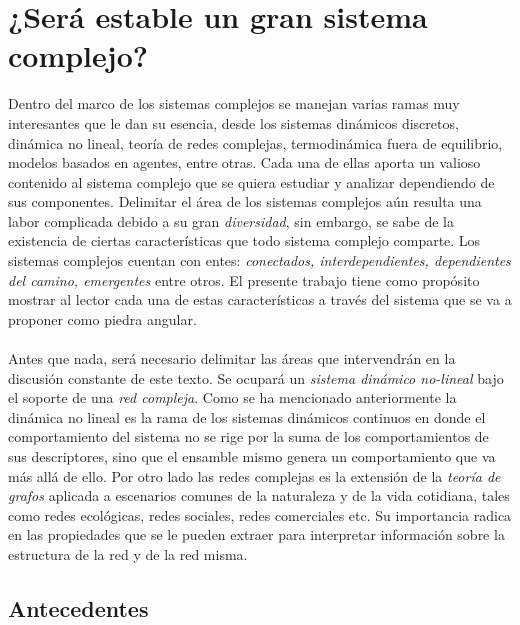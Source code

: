 \chapter{¿Será estable un gran sistema complejo?}

Dentro del marco de los sistemas complejos se manejan varias ramas muy interesantes que le dan su esencia, desde los sistemas dinámicos discretos, dinámica no lineal, teoría de redes complejas, termodinámica fuera de equilibrio, modelos basados en agentes, entre otras. Cada una de ellas aporta un valioso contenido al sistema complejo que se quiera estudiar y analizar dependiendo de sus componentes. Delimitar el área de los sistemas complejos aún resulta una labor complicada debido a su gran \textit{diversidad}, sin embargo, se sabe de la existencia de ciertas características que todo sistema complejo comparte. Los sistemas complejos cuentan con entes: \textit{conectados, interdependientes, dependientes del camino, emergentes} entre otros. El presente trabajo tiene como propósito mostrar al lector cada una de estas características a través del sistema que se va a proponer como piedra angular.\\
\\
Antes que nada, será necesario delimitar las áreas que intervendrán en la discusión constante de este texto. Se ocupará un \textit{sistema dinámico no-lineal} bajo el soporte de una \textit{red compleja}. Como se ha mencionado anteriormente la dinámica no lineal es la rama de los sistemas dinámicos continuos en donde el comportamiento del sistema no se rige por la suma de los comportamientos de sus descriptores, sino que el ensamble mismo genera un comportamiento que va más allá de ello. Por otro lado las redes complejas es la extensión de la \textit{teoría de grafos} aplicada a escenarios comunes de la naturaleza y de la vida cotidiana, tales como redes ecológicas, redes sociales, redes comerciales etc. Su importancia radica en las propiedades que se le pueden extraer para interpretar información sobre la estructura de la red y de la red misma.

\section{Antecedentes}\label{sec:Antecedentes}

